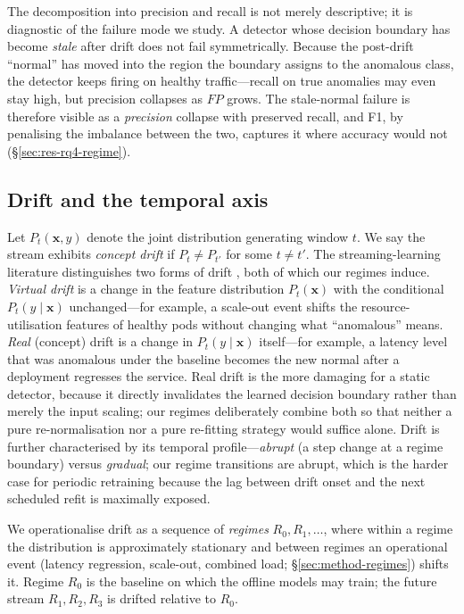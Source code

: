 \documentclass[acmsmall]{acmart}
\begin{document}
The decomposition into precision and recall is not merely descriptive; it is diagnostic of the failure mode we study. A detector whose decision boundary has become \emph{stale} after drift does not fail symmetrically. Because the post-drift ``normal'' has moved into the region the boundary assigns to the anomalous class, the detector keeps firing on healthy traffic---recall on true anomalies may even stay high, but precision collapses as $FP$ grows. The stale-normal failure is therefore visible as a \emph{precision} collapse with preserved recall, and F1, by penalising the imbalance between the two, captures it where accuracy would not (\S\ref{sec:res-rq4-regime}).

\subsection{Drift and the temporal axis}\label{sec:prob-drift}

Let $P_t(\mathbf{x}, y)$ denote the joint distribution generating window $t$. We say the stream exhibits \emph{concept drift} if $P_t \neq P_{t'}$ for some $t \neq t'$. The streaming-learning literature distinguishes two forms of drift \cite{arora2024drift}, both of which our regimes induce. \emph{Virtual drift} is a change in the feature distribution $P_t(\mathbf{x})$ with the conditional $P_t(y\mid\mathbf{x})$ unchanged---for example, a scale-out event shifts the resource-utilisation features of healthy pods without changing what ``anomalous'' means. \emph{Real} (concept) drift is a change in $P_t(y\mid\mathbf{x})$ itself---for example, a latency level that was anomalous under the baseline becomes the new normal after a deployment regresses the service. Real drift is the more damaging for a static detector, because it directly invalidates the learned decision boundary rather than merely the input scaling; our regimes deliberately combine both so that neither a pure re-normalisation nor a pure re-fitting strategy would suffice alone. Drift is further characterised by its temporal profile---\emph{abrupt} (a step change at a regime boundary) versus \emph{gradual}; our regime transitions are abrupt, which is the harder case for periodic retraining because the lag between drift onset and the next scheduled refit is maximally exposed.

We operationalise drift as a sequence of \emph{regimes} $R_0, R_1, \dots$, where within a regime the distribution is approximately stationary and between regimes an operational event (latency regression, scale-out, combined load; \S\ref{sec:method-regimes}) shifts it. Regime $R_0$ is the baseline on which the offline models may train; the future stream $R_1, R_2, R_3$ is drifted relative to $R_0$.
\end{document}
